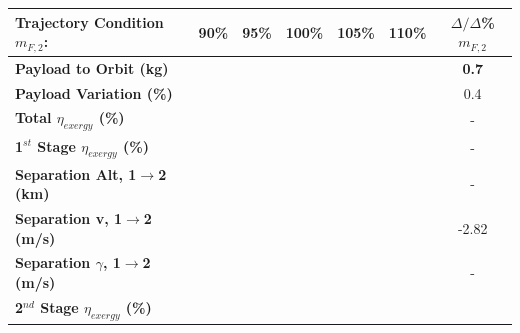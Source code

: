 \begin{table}[ht]
	\centering
\begin{tabular}{l c c c c c c} 
	\hline \textbf{Trajectory Condition}   \qquad  $m_{F,2}$:
	&90\%
	&95\%
	&100\%
	&105\%
	&110\%
	& $\Delta/\Delta$\%$m_{F,2}$
	\\
	\hline \textbf{Payload to Orbit (kg)}
	& \textbf{\PayloadToOrbitmFuelNinety}
	& \textbf{\PayloadToOrbitmFuelNinetyFive}
	& \textbf{\PayloadToOrbitmFuelStandard}
	& \textbf{\PayloadToOrbitmFuelOneHundredFive}
	& \textbf{\PayloadToOrbitmFuelOneHundredTen}
	&\textbf{0.7}
	\\
	\textbf{Payload Variation (\%)}
	& \PayloadVarmFuelNinety
	& \PayloadVarmFuelNinetyFive
	& \PayloadVarmFuelStandard
	& \PayloadVarmFuelOneHundredFive
	& \PayloadVarmFuelOneHundredTen
	&0.4
	\\
	\textbf{Total $\eta_{exergy}$ (\%)}
	& \textbf{\totalExergyEffmFuelNinety}
	& \textbf{\totalExergyEffmFuelNinetyFive}
	& \textbf{\totalExergyEffmFuelStandard}
	& \textbf{\totalExergyEffmFuelOneHundredFive}
	& \textbf{\totalExergyEffmFuelOneHundredTen}
	& -
	\\
	\hline 
	\textbf{1$^{st}$ Stage $\eta_{exergy}$ (\%)}
	& \textbf{\firstExergyEffmFuelNinety}
	& \textbf{\firstExergyEffmFuelNinetyFive}
	& \textbf{\firstExergyEffmFuelStandard}
	& \textbf{\firstExergyEffmFuelOneHundredFive}
	& \textbf{\firstExergyEffmFuelOneHundredTen}
	& -
	\\
	\textbf{Separation Alt, 1$\rightarrow$2 (km)}
	& \firstsecondSeparationAltmFuelNinety
	& \firstsecondSeparationAltmFuelNinetyFive
	& \firstsecondSeparationAltmFuelStandard
	& \firstsecondSeparationAltmFuelOneHundredFive
	& \firstsecondSeparationAltmFuelOneHundredTen
	& -
	\\
	\textbf{Separation v, 1$\rightarrow$2 (m/s)}
	& \firstsecondSeparationvmFuelNinety
	& \firstsecondSeparationvmFuelNinetyFive
	& \firstsecondSeparationvmFuelStandard
	& \firstsecondSeparationvmFuelOneHundredFive
	& \firstsecondSeparationvmFuelOneHundredTen
	&-2.82
	\\
	\textbf{Separation $\gamma$, 1$\rightarrow$2 (m/s)}
	& \firstsecondSeparationgammamFuelNinety
	& \firstsecondSeparationgammamFuelNinetyFive
	& \firstsecondSeparationgammamFuelStandard
	& \firstsecondSeparationgammamFuelOneHundredFive
	& \firstsecondSeparationgammamFuelOneHundredTen
	& -
	\\
	\hline 
	\textbf{2$^{nd}$ Stage $\eta_{exergy}$ (\%)}
	& \textbf{\secondExergyEffmFuelNinety}
	& \textbf{\secondExergyEffmFuelNinetyFive}
	& \textbf{\secondExergyEffmFuelStandard}

\end{tabular}
\end{table}

